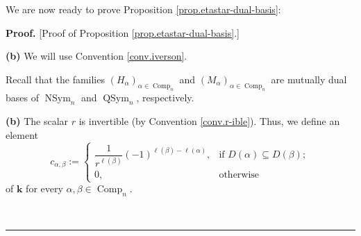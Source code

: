 \documentclass[numbers=enddot,12pt,final,onecolumn,notitlepage]{scrartcl}%
\theoremstyle{definition}
\newenvironment{proof}[1][Proof]{\noindent\textbf{#1.} }{\ \rule{0.5em}{0.5em}}
\newenvironment{verlong}{}{}
\newenvironment{vershort}{}{}
\begin{document}
We are now ready to prove Proposition \ref{prop.etastar-dual-basis}:

\begin{proof}
[Proof of Proposition \ref{prop.etastar-dual-basis}.]

\begin{verlong}
\textbf{(b)} We will use Convention \ref{conv.iverson}.

Recall that the families $\left(  H_{\alpha}\right)  _{\alpha\in
\operatorname*{Comp}\nolimits_{n}}$ and $\left(  M_{\alpha}\right)
_{\alpha\in\operatorname*{Comp}\nolimits_{n}}$ are mutually dual bases of
$\operatorname*{NSym}\nolimits_{n}$ and $\operatorname*{QSym}\nolimits_{n}$, respectively.
\end{verlong}

\begin{vershort}
\textbf{(b)} The scalar $r$ is invertible (by Convention \ref{conv.r-ible}).
Thus, we define an element%
\[
c_{\alpha,\beta}:=%
\begin{cases}
\dfrac{1}{r^{\ell\left(  \beta\right)  }}\left(  -1\right)  ^{\ell\left(
\beta\right)  -\ell\left(  \alpha\right)  }, & \text{if }D\left(
\alpha\right)  \subseteq D\left(  \beta\right)  ;\\
0, & \text{otherwise}%
\end{cases}
\]
of $\mathbf{k}$ for every $\alpha,\beta\in\operatorname*{Comp}\nolimits_{n}$.
\end{vershort}


\end{proof}
\end{document}

